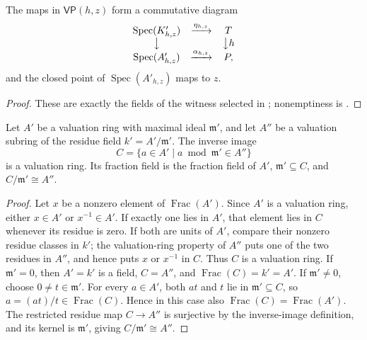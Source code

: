\begin{lemma}
  \label{lemma:nagata-dense-valuation-probe}

  The maps in $\mathsf{VP}(h,z)$ form a commutative diagram
  \[
    \begin{array}{ccc}
      \operatorname{Spec}(K'_{h,z})&\xrightarrow{\eta_{h,z}}&T\\
      \big\downarrow&&\big\downarrow h\\
      \operatorname{Spec}(A'_{h,z})&\xrightarrow{\alpha_{h,z}}&P,
    \end{array}
  \]
  and the closed point of $\operatorname{Spec}(A'_{h,z})$ maps to $z$.
\end{lemma}

\begin{proof}
  These are exactly the fields of the witness selected in
  ; nonemptiness is
  .
\end{proof}


\begin{lemma}
  \label{lemma:nagata-composite-valuation-ring}

  Let \(A'\) be a valuation ring with maximal ideal \(\mathfrak m'\), and let
  \(A''\) be a valuation subring of the residue field
  \(k'=A'/\mathfrak m'\).  The inverse image
  \[
    C=\{a\in A'\mid a\bmod\mathfrak m'\in A''\}
  \]
  is a valuation ring.  Its fraction field is the fraction field of \(A'\),
  \(\mathfrak m'\subseteq C\), and \(C/\mathfrak m'\cong A''\).
\end{lemma}

\begin{proof}
  Let \(x\) be a nonzero element of \(\operatorname{Frac}(A')\).  Since
  \(A'\) is a valuation ring, either \(x\in A'\) or \(x^{-1}\in A'\).  If
  exactly one lies in \(A'\), that element lies in \(C\) whenever its residue
  is zero.  If both are units of \(A'\), compare their nonzero residue classes
  in \(k'\); the valuation-ring property of \(A''\) puts one of the two
  residues in \(A''\), and hence puts \(x\) or \(x^{-1}\) in \(C\).  Thus
  \(C\) is a valuation ring.  If $\mathfrak m'=0$, then $A'=k'$ is a field,
  $C=A''$, and $\operatorname{Frac}(C)=k'=A'$.  If
  $\mathfrak m'\ne0$, choose $0\ne t\in\mathfrak m'$.  For every $a\in A'$,
  both $at$ and $t$ lie in $\mathfrak m'\subseteq C$, so
  $a=(at)/t\in\operatorname{Frac}(C)$.  Hence in this case also
  $\operatorname{Frac}(C)=\operatorname{Frac}(A')$.  The restricted residue
  map $C\to A''$ is surjective by the inverse-image definition, and its
  kernel is $\mathfrak m'$, giving $C/\mathfrak m'\cong A''$.
\end{proof}

